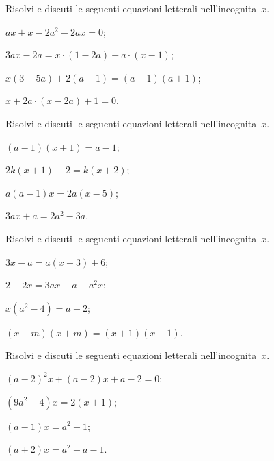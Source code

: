 \begin{esercizio}
\label{ese:19.3}
Risolvi e discuti le seguenti equazioni letterali nell'incognita~$x$.
\begin{multicols}{2}
\begin{enumeratea}
 \item $ax+x-2a^{2}-2ax=0$;
 \item $3ax-2a=x\cdot (1-2a)+a\cdot (x-1)$;
 \item $x (3-5a)+2 (a-1)=(a-1) (a+1)$;
 \item $x+2a\cdot (x-2a)+1=0$.
\end{enumeratea}
\end{multicols}
\end{esercizio}
\begin{esercizio}[\Ast]
\label{ese:19.4}
Risolvi e discuti le seguenti equazioni letterali nell'incognita~$x$.
\begin{multicols}{2}
\begin{enumeratea}
 \item $(a-1)(x+1)=a-1$;
 \item $2k(x+1)-2=k(x+2)$;
 \item $a(a-1)x=2a(x-5)$;
 \item $3ax+a=2a^{2}-3a$.
\end{enumeratea}
\end{multicols}
\end{esercizio}

\begin{esercizio}[\Ast]
\label{ese:19.5}
Risolvi e discuti le seguenti equazioni letterali nell'incognita~$x$.
\begin{multicols}{2}
\begin{enumeratea}
 \item $3x-a=a(x-3)+6$;
 \item $2+2x=3ax+a-a^{2}x$;
 \item $x(a^{2}-4)=a+2$;
 \item $(x-m)(x+m)=(x+1)(x-1)$.
\end{enumeratea}
\end{multicols}
\end{esercizio}

\begin{esercizio}[\Ast]
\label{ese:19.6}
Risolvi e discuti le seguenti equazioni letterali nell'incognita~$x$.
\begin{multicols}{2}
\begin{enumeratea}
 \item $(a-2)^{2}x+(a-2)x+a-2=0$;
 \item $\left(9a^{2}-4\right)x=2(x+1)$;
 \item $(a-1)x=a^{2}-1$;
 \item $(a+2)x=a^{2}+a-1$.
\end{enumeratea}
\end{multicols}
\end{esercizio}

